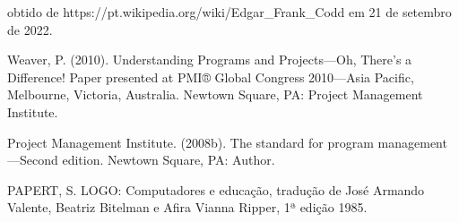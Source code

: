 \documentclass[
12pt,		%
openright,	%
twoside,  %
a4paper,			%
chapter=TITLE,		%
english,			%
french,				%
spanish,			%
brazil				%
]{USPSC-classe/USPSC}
\begin{document}
\begin{flushleft}
\begin{flushleft}
\begin{flushleft}
\begin{flushleft}
 obtido de https://pt.wikipedia.org/wiki/Edgar\_Frank\_Codd em 21 de setembro de 2022.
\end{flushleft}


\end{flushleft}


\end{flushleft}


\end{flushleft}


\begin{flushleft}
\begin{flushleft}
\begin{flushleft}
\begin{flushleft}
[Weaver, 2010] Weaver, P. (2010). Understanding Programs and Projects—Oh, There's a Difference! Paper presented at PMI® Global Congress 2010—Asia Pacific, Melbourne, Victoria, Australia. Newtown Square, PA: Project Management Institute.
\end{flushleft}


\end{flushleft}


\end{flushleft}


\end{flushleft}


\begin{flushleft}
\begin{flushleft}
\begin{flushleft}
\begin{flushleft}
[PMI, 2008] Project Management Institute. (2008b). The standard for program management—Second edition. Newtown Square, PA: Author.
\end{flushleft}


\end{flushleft}


\end{flushleft}


\end{flushleft}


\begin{flushleft}
\begin{flushleft}
\begin{flushleft}
\begin{flushleft}
[PAPERT, 1980] PAPERT, S. LOGO: Computadores e educa\c{c}\~ao, tradu\c{c}\~ao de Jos\'e Armando Valente, Beatriz Bitelman e Afira Vianna Ripper, 1ª edi\c{c}\~ao 1985.
\end{flushleft}


\end{flushleft}


\end{flushleft}


\end{flushleft}
\end{document}
